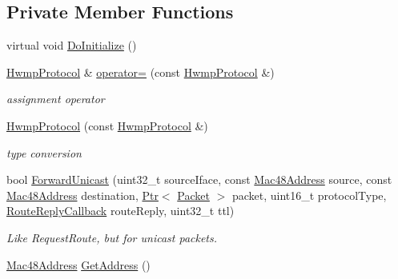 \subsection*{Private Member Functions}
\begin{DoxyCompactItemize}
\item 
virtual void \hyperlink{classns3_1_1dot11s_1_1HwmpProtocol_a67a93c2ef31e7ca0d23b07c8c6edcd90}{Do\+Initialize} ()
\item 
\hyperlink{classns3_1_1dot11s_1_1HwmpProtocol}{Hwmp\+Protocol} \& \hyperlink{classns3_1_1dot11s_1_1HwmpProtocol_a23cd242a5fed8cf3d5baea3304cc92de}{operator=} (const \hyperlink{classns3_1_1dot11s_1_1HwmpProtocol}{Hwmp\+Protocol} \&)
\begin{DoxyCompactList}\small\item\em assignment operator \end{DoxyCompactList}\item 
\hyperlink{classns3_1_1dot11s_1_1HwmpProtocol_a52333fe51a8148fb17e5ac736735a26c}{Hwmp\+Protocol} (const \hyperlink{classns3_1_1dot11s_1_1HwmpProtocol}{Hwmp\+Protocol} \&)
\begin{DoxyCompactList}\small\item\em type conversion \end{DoxyCompactList}\item 
bool \hyperlink{classns3_1_1dot11s_1_1HwmpProtocol_ad2284f9a590203f8c407e3ab03560edf}{Forward\+Unicast} (uint32\+\_\+t source\+Iface, const \hyperlink{classns3_1_1Mac48Address}{Mac48\+Address} source, const \hyperlink{classns3_1_1Mac48Address}{Mac48\+Address} destination, \hyperlink{classns3_1_1Ptr}{Ptr}$<$ \hyperlink{classns3_1_1Packet}{Packet} $>$ packet, uint16\+\_\+t protocol\+Type, \hyperlink{classns3_1_1MeshL2RoutingProtocol_a4c415efa22789b3a3bb5538b8fcf3e6a}{Route\+Reply\+Callback} route\+Reply, uint32\+\_\+t ttl)
\begin{DoxyCompactList}\small\item\em Like Request\+Route, but for unicast packets. \end{DoxyCompactList}\item 
\hyperlink{classns3_1_1Mac48Address}{Mac48\+Address} \hyperlink{classns3_1_1dot11s_1_1HwmpProtocol_ab8b2c6d98ae278406f543e25feca8ccc}{Get\+Address} ()
\end{DoxyCompactItemize}
